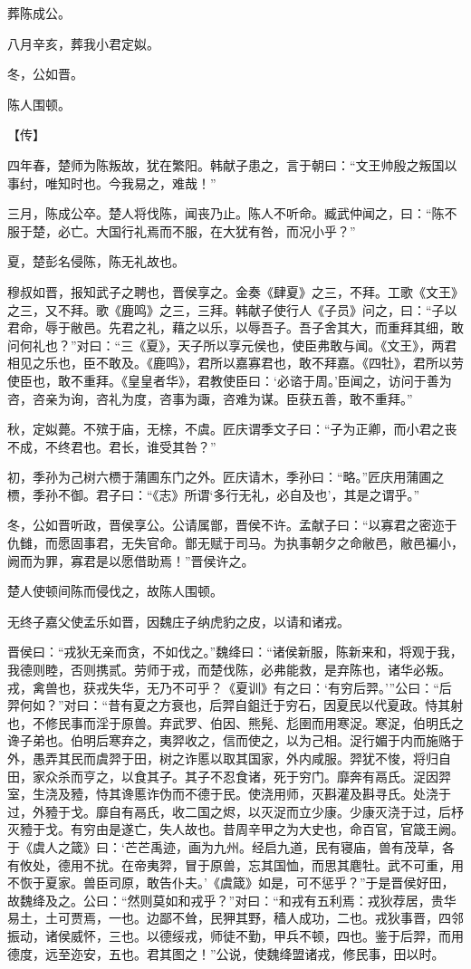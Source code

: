 \documentclass[a4paper,12pt,UTF8,twoside]{ctexbook}
\begin{document}
葬陈成公。

八月辛亥，葬我小君定姒。

冬，公如晋。

陈人围顿。

【传】

四年春，楚师为陈叛故，犹在繁阳。韩献子患之，言于朝曰：“文王帅殷之叛国以事纣，唯知时也。今我易之，难哉！”

三月，陈成公卒。楚人将伐陈，闻丧乃止。陈人不听命。臧武仲闻之，曰：“陈不服于楚，必亡。大国行礼焉而不服，在大犹有咎，而况小乎？”

夏，楚彭名侵陈，陈无礼故也。

穆叔如晋，报知武子之聘也，晋侯享之。金奏《肆夏》之三，不拜。工歌《文王》之三，又不拜。歌《鹿鸣》之三，三拜。韩献子使行人《子员》问之，曰：“子以君命，辱于敝邑。先君之礼，藉之以乐，以辱吾子。吾子舍其大，而重拜其细，敢问何礼也？”对曰：“三《夏》，天子所以享元侯也，使臣弗敢与闻。《文王》，两君相见之乐也，臣不敢及。《鹿鸣》，君所以嘉寡君也，敢不拜嘉。《四牡》，君所以劳使臣也，敢不重拜。《皇皇者华》，君教使臣曰：‘必谘于周。’臣闻之，访问于善为咨，咨亲为询，咨礼为度，咨事为諏，咨难为谋。臣获五善，敢不重拜。”

秋，定姒薨。不殡于庙，无榇，不虞。匠庆谓季文子曰：“子为正卿，而小君之丧不成，不终君也。君长，谁受其咎？”

初，季孙为己树六槚于蒲圃东门之外。匠庆请木，季孙曰：“略。”匠庆用蒲圃之槚，季孙不御。君子曰：“《志》所谓‘多行无礼，必自及也’，其是之谓乎。”

冬，公如晋听政，晋侯享公。公请属鄫，晋侯不许。孟献子曰：“以寡君之密迩于仇雠，而愿固事君，无失官命。鄫无赋于司马。为执事朝夕之命敝邑，敝邑褊小，阙而为罪，寡君是以愿借助焉！”晋侯许之。

楚人使顿间陈而侵伐之，故陈人围顿。

无终子嘉父使孟乐如晋，因魏庄子纳虎豹之皮，以请和诸戎。

晋侯曰：“戎狄无亲而贪，不如伐之。”魏绛曰：“诸侯新服，陈新来和，将观于我，我德则睦，否则携贰。劳师于戎，而楚伐陈，必弗能救，是弃陈也，诸华必叛。戎，禽兽也，获戎失华，无乃不可乎？《夏训》有之曰：‘有穷后羿。’”公曰：“后羿何如？”对曰：“昔有夏之方衰也，后羿自鉏迁于穷石，因夏民以代夏政。恃其射也，不修民事而淫于原兽。弃武罗、伯因、熊髡、尨圉而用寒浞。寒浞，伯明氏之谗子弟也。伯明后寒弃之，夷羿收之，信而使之，以为己相。浞行媚于内而施赂于外，愚弄其民而虞羿于田，树之诈慝以取其国家，外内咸服。羿犹不悛，将归自田，家众杀而亨之，以食其子。其子不忍食诸，死于穷门。靡奔有鬲氏。浞因羿室，生浇及豷，恃其谗慝诈伪而不德于民。使浇用师，灭斟灌及斟寻氏。处浇于过，外豷于戈。靡自有鬲氏，收二国之烬，以灭浞而立少康。少康灭浇于过，后杼灭豷于戈。有穷由是遂亡，失人故也。昔周辛甲之为大史也，命百官，官箴王阙。于《虞人之箴》曰：‘芒芒禹迹，画为九州。经启九道，民有寝庙，兽有茂草，各有攸处，德用不扰。在帝夷羿，冒于原兽，忘其国恤，而思其麀牡。武不可重，用不恢于夏家。兽臣司原，敢告仆夫。’《虞箴》如是，可不惩乎？”于是晋侯好田，故魏绛及之。公曰：“然则莫如和戎乎？”对曰：“和戎有五利焉：戎狄荐居，贵华易土，土可贾焉，一也。边鄙不耸，民狎其野，穑人成功，二也。戎狄事晋，四邻振动，诸侯威怀，三也。以德绥戎，师徒不勤，甲兵不顿，四也。鉴于后羿，而用德度，远至迩安，五也。君其图之！”公说，使魏绛盟诸戎，修民事，田以时。
\end{document}
